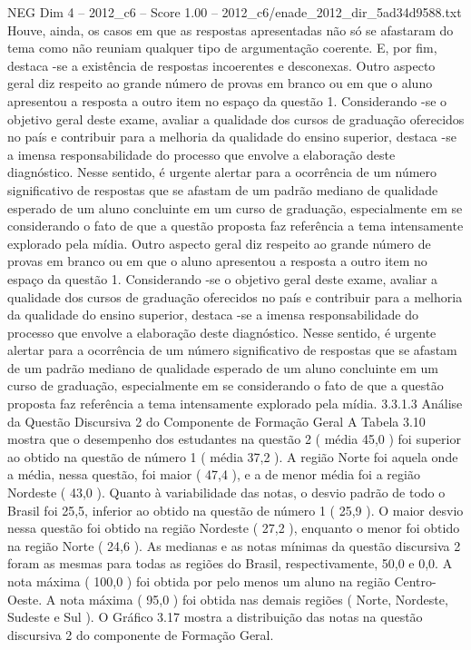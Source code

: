 \begin{textsample}{NEG Dim 4 – 2012\_c6 – Score 1.00 – 2012\_c6/enade\_2012\_dir\_5ad34d9588.txt}
Houve, ainda, os casos em que as respostas apresentadas não só se afastaram do tema como não reuniam qualquer tipo de argumentação coerente.
E, por fim, destaca -se a existência de respostas incoerentes e desconexas.
Outro aspecto geral diz respeito ao grande número de provas em branco ou em que o aluno apresentou a resposta a outro item no espaço da questão 1.
Considerando -se o objetivo geral deste exame, avaliar a qualidade dos cursos de graduação oferecidos no país e contribuir para a melhoria da qualidade do ensino superior, destaca -se a imensa responsabilidade do processo que envolve a elaboração deste diagnóstico.
Nesse sentido, é urgente alertar para a ocorrência de um número significativo de respostas que se afastam de um padrão mediano de qualidade esperado de um aluno concluinte em um curso de graduação, especialmente em se considerando o fato de que a questão proposta faz referência a tema intensamente explorado pela mídia.
Outro aspecto geral diz respeito ao grande número de provas em branco ou em que o aluno apresentou a resposta a outro item no espaço da questão 1.
Considerando -se o objetivo geral deste exame, avaliar a qualidade dos cursos de graduação oferecidos no país e contribuir para a melhoria da qualidade do ensino superior, destaca -se a imensa responsabilidade do processo que envolve a elaboração deste diagnóstico.
Nesse sentido, é urgente alertar para a ocorrência de um número significativo de respostas que se afastam de um padrão mediano de qualidade esperado de um aluno concluinte em um curso de graduação, especialmente em se considerando o fato de que a questão proposta faz referência a tema intensamente explorado pela mídia. 3.3.1.3 Análise da Questão Discursiva 2 do Componente de Formação Geral A Tabela 3.10 mostra que o desempenho dos estudantes na questão 2 ( média 45,0 ) foi superior ao obtido na questão de número 1 ( média 37,2 ).
A região Norte foi aquela onde a média, nessa questão, foi maior ( 47,4 ), e a de menor média foi a região Nordeste ( 43,0 ).
Quanto à variabilidade das notas, o desvio padrão de todo o Brasil foi 25,5, inferior ao obtido na questão de número 1 ( 25,9 ).
O maior desvio nessa questão foi obtido na região Nordeste ( 27,2 ), enquanto o menor foi obtido na região Norte ( 24,6 ).
As medianas e as notas mínimas da questão discursiva 2 foram as mesmas para todas as regiões do Brasil, respectivamente, 50,0 e 0,0.
A nota máxima ( 100,0 ) foi obtida por pelo menos um aluno na região Centro-Oeste.
A nota máxima ( 95,0 ) foi obtida nas demais regiões ( Norte, Nordeste, Sudeste e Sul ).
O Gráfico 3.17 mostra a distribuição das notas na questão discursiva 2 do componente de Formação Geral.

\end{textsample}
